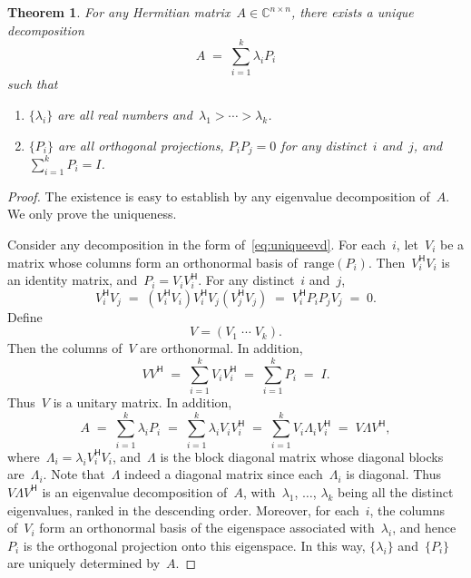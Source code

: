 \documentclass[11pt,a4paper]{article}  %
\numberwithin{equation}{section}
\newtheorem{theorem}{Theorem}%
\theoremstyle{definition}
\def\CC{\mathbb{C}}
\newcommand{\hmt}{{\scriptscriptstyle{{\mathsf{H}}}}}
\newcommand{\range}{\mathrm{range}}
\begin{document}
\begin{theorem}
  \label{th:uniqueevd}
  For any Hermitian matrix~$A \in\CC^{n\times n}$, there exists a unique decomposition
  \begin{equation}
    \label{eq:uniqueevd}
    A \;=\; \sum_{i=1}^k \lambda_i P_i
  \end{equation}
  such that
  \begin{enumerate}
    \item $\{\lambda_i\}$ are all real numbers and~$\lambda_1 > \cdots
      > \lambda_k$.
    \item $\{P_i\}$ are all orthogonal projections, $P_iP_j = 0$ for any distinct~$i$ and~$j$,
      and~$\sum_{i=1}^k P_i = I$.
  \end{enumerate}
\end{theorem}

\begin{proof}
  The existence is easy to establish by any eigenvalue decomposition of~$A$. We only prove the uniqueness.

  Consider any decomposition in the form of~\eqref{eq:uniqueevd}.
  For each~$i$, let~$V_i$ be a matrix whose columns form an orthonormal basis
  of~$\range(P_i)$. Then~$V_i^\hmt V_i$ is an identity matrix, and~$P_i = V_iV_i^\hmt$. For any
  distinct~$i$ and~$j$,
  \begin{equation*}
    V_i^\hmt V_j \;=\;(V_i^\hmt V_i) V_i^\hmt V_j(V_j^\hmt V_j) \;=\; V_i^\hmt P_iP_j V_j\;=\; 0.
  \end{equation*}
  Define
  \begin{equation*}
    V = (V_1\; \cdots \; V_k).
  \end{equation*}
  Then the columns of~$V$ are orthonormal. In addition,
  \begin{equation*}
    VV^\hmt \;=\; \sum_{i=1}^k V_iV_i^\hmt \;=\; \sum_{i=1}^k P_i \;=\; I.
  \end{equation*}
  Thus~$V$ is a unitary matrix. In addition,
  \begin{equation*}
    A \;=\; \sum_{i=1}^k \lambda_i P_i \;=\; \sum_{i=1}^k\lambda_iV_iV_i^\hmt \;=\; \sum_{i=1}^k V_i\Lambda_iV_i^\hmt \;=\; V\Lambda V^\hmt,
  \end{equation*}
  where~$\Lambda_i = \lambda_i V_i^\hmt V_i$, and~$\Lambda$ is the block diagonal matrix whose
  diagonal blocks are~$\Lambda_i$. Note that~$\Lambda$ indeed a diagonal matrix since
  each~$\Lambda_i$ is diagonal. Thus~$V\Lambda V^\hmt$ is an eigenvalue decomposition of~$A$,
  with~$\lambda_1$, $\dots$, $\lambda_k$ being all the distinct eigenvalues, ranked in the descending
  order. Moreover, for
  each~$i$, the columns
  of~$V_i$ form an orthonormal basis of the eigenspace associated with~$\lambda_i$, and
  hence~$P_i$ is the orthogonal projection onto this eigenspace. In this way, $\{\lambda_i\}$
  and~$\{P_i\}$ are uniquely determined by~$A$.
\end{proof}
\end{document}
